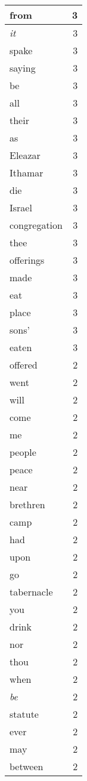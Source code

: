 \begin{center}
\begin{longtable}{l|r}
from & 3 \\ \hline
\emph{it} & 3 \\ \hline
spake & 3 \\ \hline
saying & 3 \\ \hline
be & 3 \\ \hline
all & 3 \\ \hline
their & 3 \\ \hline
as & 3 \\ \hline
Eleazar & 3 \\ \hline
Ithamar & 3 \\ \hline
die & 3 \\ \hline
Israel & 3 \\ \hline
congregation & 3 \\ \hline
thee & 3 \\ \hline
offerings & 3 \\ \hline
made & 3 \\ \hline
eat & 3 \\ \hline
place & 3 \\ \hline
sons' & 3 \\ \hline
eaten & 3 \\ \hline
offered & 2 \\ \hline
went & 2 \\ \hline
will & 2 \\ \hline
come & 2 \\ \hline
me & 2 \\ \hline
people & 2 \\ \hline
peace & 2 \\ \hline
near & 2 \\ \hline
brethren & 2 \\ \hline
camp & 2 \\ \hline
had & 2 \\ \hline
upon & 2 \\ \hline
go & 2 \\ \hline
tabernacle & 2 \\ \hline
you & 2 \\ \hline
drink & 2 \\ \hline
nor & 2 \\ \hline
thou & 2 \\ \hline
when & 2 \\ \hline
\emph{be} & 2 \\ \hline
statute & 2 \\ \hline
ever & 2 \\ \hline
may & 2 \\ \hline
between & 2 \\ \hline

\end{longtable}
\end{center}
